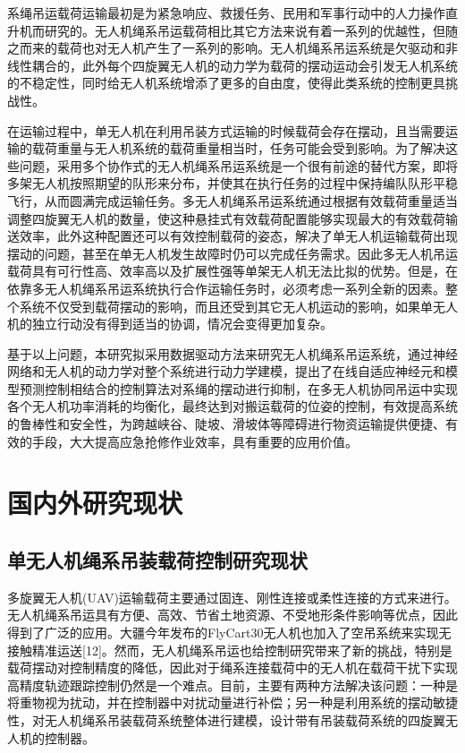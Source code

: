 \documentclass[lang=chs, degree=master, blindreview=false, winfonts=true]{yanputhesis}
\begin{document}
系绳吊运载荷运输最初是为紧急响应、救援任务、民用和军事行动中的人力操作直升机而研究的\cite{2020A}。无人机绳系吊运载荷相比其它方法来说有着一系列的优越性，但随之而来的载荷也对无人机产生了一系列的影响。无人机绳系吊运系统是欠驱动和非线性耦合的，此外每个四旋翼无人机的动力学为载荷的摆动运动会引发无人机系统的不稳定性，同时给无人机系统增添了更多的自由度，使得此类系统的控制更具挑战性。

在运输过程中，单无人机在利用吊装方式运输的时候载荷会存在摆动，且当需要运输的载荷重量与无人机系统的载荷重量相当时，任务可能会受到影响。为了解决这些问题，采用多个协作式的无人机绳系吊运系统是一个很有前途的替代方案，即将多架无人机按照期望的队形来分布，并使其在执行任务的过程中保持编队队形平稳飞行，从而圆满完成运输任务。多无人机绳系吊运系统通过根据有效载荷重量适当调整四旋翼无人机的数量，使这种悬挂式有效载荷配置能够实现最大的有效载荷输送效率，此外这种配置还可以有效控制载荷的姿态，解决了单无人机运输载荷出现摆动的问题，甚至在单无人机发生故障时仍可以完成任务需求。因此多无人机吊运载荷具有可行性高、效率高以及扩展性强等单架无人机无法比拟的优势。但是，在依靠多无人机绳系吊运系统执行合作运输任务时，必须考虑一系列全新的因素。整个系统不仅受到载荷摆动的影响，而且还受到其它无人机运动的影响，如果单无人机的独立行动没有得到适当的协调，情况会变得更加复杂。

基于以上问题，本研究拟采用数据驱动方法来研究无人机绳系吊运系统，通过神经网络和无人机的动力学对整个系统进行动力学建模，提出了在线自适应神经元和模型预测控制相结合的控制算法对系绳的摆动进行抑制，在多无人机协同吊运中实现各个无人机功率消耗的均衡化，最终达到对搬运载荷的位姿的控制，有效提高系统的鲁棒性和安全性，为跨越峡谷、陡坡、滑坡体等障碍进行物资运输提供便捷、有效的手段，大大提高应急抢修作业效率，具有重要的应用价值。

\section{国内外研究现状}
\subsection{单无人机绳系吊装载荷控制研究现状}
多旋翼无人机(UAV)运输载荷主要通过固连、刚性连接或柔性连接的方式来进行。无人机绳系吊运具有方便、高效、节省土地资源、不受地形条件影响等优点，因此得到了广泛的应用。大疆今年发布的FlyCart30无人机也加入了空吊系统来实现无接触精准运送[12]。然而，无人机绳系吊运也给控制研究带来了新的挑战，特别是载荷摆动对控制精度的降低，因此对于绳系连接载荷中的无人机在载荷干扰下实现高精度轨迹跟踪控制仍然是一个难点。目前，主要有两种方法解决该问题：一种是将重物视为扰动，并在控制器中对扰动量进行补偿；另一种是利用系统的摆动敏捷性，对无人机绳系吊装载荷系统整体进行建模，设计带有吊装载荷系统的四旋翼无人机的控制器。
\end{document}
